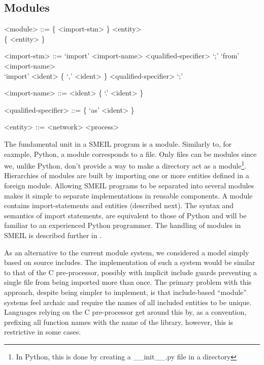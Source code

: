 \setlength{\grammarindent}{10em} %

\subsection{Modules}
\begin{grammar}
  <module> ::= \{ <import-stm> \} <entity> \\ \{ <entity> \}

  <import-stm> ::= `import' <import-name> <qualified-specifier> `;'
  \alt `from' <import-name> \\ `import' <ident> \{ `,' <ident> \} <qualified-specifier>
  `;'

  <import-name> ::= <ident> \{ `.' <ident> \}

  <qualified-specifier> ::= \{ `as' <ident> \}

  <entity> ::= <network>
  \alt <process>
\end{grammar}


The fundamental unit in a SMEIL program is a {\ttfamily module}. Similarly to,
for eaxmple, Python, a module corresponds to a file. Only files can be modules
since we, unlike Python, don't provide a way to make a directory act as a
module\footnote{In Python, this is done by creating a {\ttfamily
    \_\_init\_\_.py} file in a directory}. Hierarchies of modules are built by
importing one or more entities defined in a foreign module. Allowing SMEIL
programs to be separated into several modules makes it simple to separate
implementations in reusable components. A module contains import-statements and
entities (described next). The syntax and semantics of import statements, are
equivalent to those of Python and will be familiar to an experienced Python
programmer. The handling of modules in SMEIL is described further in
.

As an alternative to the current module system, we considered a model simply
based on source includes. The implementation of such a system would be similar
to that of the C pre-processor, possibly with implicit include guards preventing
a single file from being imported more than once. The primary problem with this
approach, despite being simpler to implement, is that include-based ``module''
systems feel archaic and require the names of all included entities to be
unique. Languages relying on the C pre-processor get around this by, as a
convention, prefixing all function names with the name of the library, however,
this is restrictive in some cases.

